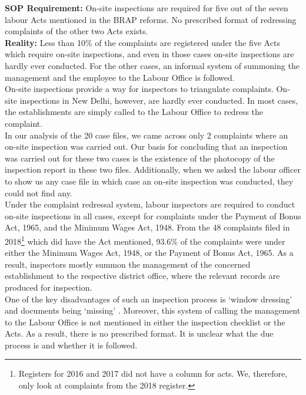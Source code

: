 \documentclass[a4paper, 12pt, twoside]{article}
\begin{document}
\textbf{SOP Requirement:} On-site inspections are required for five out of the seven labour Acts mentioned in the BRAP reforms. No prescribed format of redressing complaints of the other two Acts exists. \\

\textbf{Reality:} Less than 10\% of the complaints are registered under the five Acts which require on-site inspections, and even in those cases on-site inspections are hardly ever conducted. For the other cases, an informal system of summoning the management and the employee to the Labour Office is followed.\\
 
On-site inspections provide a way for inspectors to triangulate complaints. On-site inspections in New Delhi, however, are hardly ever conducted. In most cases, the establishments are simply called to the Labour Office to redress the complaint. \\

In our analysis of the 20 case files, we came across only 2 complaints where an on-site inspection was carried out. Our basis for concluding that an inspection was carried out for these two cases is the existence of the photocopy of the inspection report in these two files. Additionally, when we asked the labour officer to show us any case file in which case an on-site inspection was conducted, they could not find any. \\

Under the complaint redressal system, labour inspectors are required to conduct on-site inspections in all cases, except for complaints under the Payment of Bonus Act, 1965, and the Minimum Wages Act, 1948. From the 48 complaints filed in 2018\footnote{Registers for 2016 and 2017 did not have a column for acts. We, therefore, only look at complaints from the 2018 register.} which did have the Act mentioned, 93.6\% of the complaints were under either the Minimum Wages Act, 1948, or the Payment of Bonus Act, 1965. As a result, inspectors mostly summon the management of the concerned establishment to the respective district office, where the relevant records are produced for inspection. \\

One of the key disadvantages of such an inspection process is ‘window dressing’ and documents being ‘missing’ \parencite{iloreportlabour}. Moreover, this system of calling the management to the Labour Office is not mentioned in either the inspection checklist or the Acts. As a result, there is no prescribed format. It is unclear what the due process is and whether it is followed. 
\end{document}
